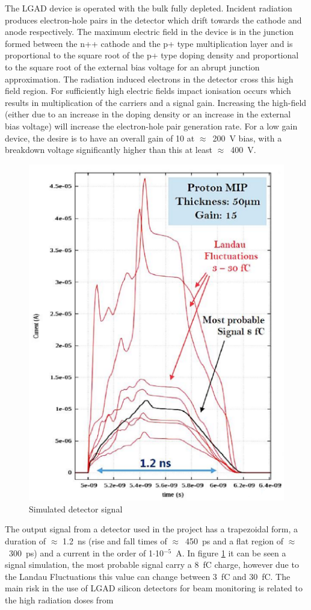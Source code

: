 \noindent The LGAD device is operated with the bulk fully depleted. Incident radiation produces electron-hole
pairs in the detector which drift towards the cathode and anode respectively. The maximum
electric field in the device is in the junction formed between the n++ cathode and the p+ type multiplication layer and is
proportional to the square root of the p+ type doping density and proportional to the square root of the
external bias voltage for an abrupt junction approximation.
The radiation induced electrons in the detector cross this high field region. For sufficiently
high electric fields impact ionisation occurs which results in multiplication of the carriers and a
signal gain.
Increasing the high-field (either due to an increase in the doping density or
an increase in the external bias voltage) will increase the electron-hole pair generation rate. For a
low gain device, the desire is to have an overall gain of 10 at $\approx$~200~V bias, with a breakdown voltage
significantly higher than this at least $\approx$~400~V.
\begin{figure}[H]
	\centering
	\includegraphics[width=0.35\linewidth]{IMG/ch2/LGAD_Signal}
	\caption{Simulated detector signal}
	\label{fig:signal}
\end{figure}
\noindent The output signal from a detector used in the project has a trapezoidal form, a duration of $\approx$ 1.2~ns (rise and fall times of $\approx$~450~ps and a 
flat region of $\approx$~300~ps) and a current in the order of 1$\cdot$10$^{-5}$~A.
In figure \ref{fig:signal} it can be seen a signal simulation, the most probable signal carry a 8~fC charge, however due to the Landau Fluctuations this value can change between 3~fC and 30~fC.
\noindent The main risk in
the use of LGAD silicon detectors for beam monitoring is related to the high radiation doses from
